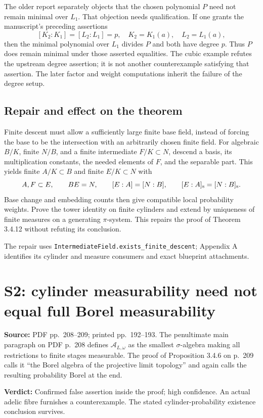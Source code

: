 \documentclass[11pt,a4paper]{article}
\newcommand{\A}{\mathcal A}
\newcommand{\code}[1]{{\small\nolinkurl{#1}}}
\newcommand{\loc}[2]{\par\noindent\textbf{Source:} PDF pp.~#1; printed pp.~#2.}
\newcommand{\verdict}[1]{\par\noindent\textbf{Verdict:} #1\par}
\begin{document}
The older report separately objects that the chosen polynomial $P$ need not remain minimal over $L_1$. That objection needs qualification. If one grants the manuscript's preceding assertions
\[
 [K_2:K_1]=[L_2:L_1]=p,\quad K_2=K_1(a),\quad L_2=L_1(a),
\]
then the minimal polynomial over $L_1$ divides $P$ and both have degree $p$. Thus $P$ does remain minimal under those asserted equalities. The cubic example refutes the upstream degree assertion; it is not another counterexample satisfying that assertion. The later factor and weight computations inherit the failure of the degree setup.

\subsection{Repair and effect on the theorem}
Finite descent must allow a sufficiently large finite base field, instead of forcing the base to be the intersection with an arbitrarily chosen finite field. For algebraic $B/K$, finite $N/B$, and a finite intermediate $F/K\subset N$, descend a basis, its multiplication constants, the needed elements of $F$, and the separable part. This yields finite $A/K\subset B$ and finite $E/K\subset N$ with
\[
 A,F\subset E,\qquad BE=N,\qquad
 [E:A]=[N:B],\qquad [E:A]_{\rm s}=[N:B]_{\rm s}.
\]
Base change and embedding counts then give compatible local probability weights. Prove the tower identity on finite cylinders and extend by uniqueness of finite measures on a generating $\pi$-system. This repairs the proof of Theorem 3.4.12 without refuting its conclusion.

The repair uses \code{IntermediateField.exists_finite_descent}; Appendix A identifies its cylinder and measure consumers and exact blueprint attachments.

\clearpage
\section{S2: cylinder measurability need not equal full Borel measurability}\label{s2}
\loc{208--209}{192--193}
The penultimate main paragraph on PDF p.~208 defines $\A_{L,\omega}$ as the smallest $\sigma$-algebra making all restrictions to finite stages measurable. The proof of Proposition 3.4.6 on p.~209 calls it “the Borel algebra of the projective limit topology” and again calls the resulting probability Borel at the end.
\verdict{Confirmed false assertion inside the proof; high confidence. An actual adelic fibre furnishes a counterexample. The stated cylinder-probability existence conclusion survives.}
\end{document}
